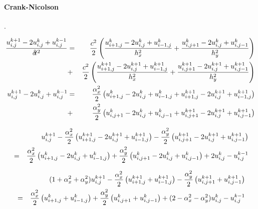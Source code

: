 \paragraph{Crank-Nicolson}.

\begin{eqnarray}
\frac{ u_{i,j}^{k+1} -2u_{i,j}^{k} +u_{i,j}^{k-1}  }{\delta\! t^2} 
&=& 
\frac{c^2}{2}
\left(
\frac{ u_{i+1,j}^{k} -2u_{i,j}^{k} +u_{i-1,j}^{k}  }{h_x^2} 
+
\frac{ u_{i,j+1}^{k} -2u_{i,j}^{k} +u_{i,j-1}^{k}  }{h_y^2} 
\right)
\nonumber\\
&+&
\frac{c^2}{2}
\left(
\frac{ u_{i+1,j}^{k+1} -2u_{i,j}^{k+1} +u_{i-1,j}^{k+1}  }{h_x^2} 
+
\frac{ u_{i,j+1}^{k+1} -2u_{i,j}^{k+1} +u_{i,j-1}^{k+1}  }{h_y^2} 
\right) 
\nonumber\\
u_{i,j}^{k+1} -2u_{i,j}^{k} +u_{i,j}^{k-1}  
&=&
\frac{\alpha_x^2}{2}
\left(
 u_{i+1,j}^{k} -2u_{i,j}^{k} +u_{i-1,j}^{k}  
+
 u_{i+1,j}^{k+1} -2u_{i,j}^{k+1} +u_{i-1,j}^{k+1}
\right) \nonumber\\
&+&
\frac{\alpha_y^2}{2}
\left(
u_{i,j+1}^{k} -2u_{i,j}^{k} +u_{i,j-1}^{k}  
+
u_{i,j+1}^{k+1} -2u_{i,j}^{k+1} +u_{i,j-1}^{k+1}
\right)
\nonumber
\end{eqnarray}

\begin{eqnarray}
&&u_{i,j}^{k+1} 
-\frac{\alpha_x^2}{2} \left( u_{i+1,j}^{k+1} -2u_{i,j}^{k+1} +u_{i-1,j}^{k+1} \right) 
-\frac{\alpha_y^2}{2} \left( u_{i,j+1}^{k+1} -2u_{i,j}^{k+1} +u_{i,j-1}^{k+1} \right) \nonumber\\
&=&
 \frac{\alpha_x^2}{2} \left( u_{i+1,j}^{k} -2u_{i,j}^{k} +u_{i-1,j}^{k}  \right)
+\frac{\alpha_y^2}{2} \left( u_{i,j+1}^{k} -2u_{i,j}^{k} +u_{i,j-1}^{k}  \right)
+2u_{i,j}^{k} -u_{i,j}^{k-1}  
\end{eqnarray}



\begin{mdframed}[backgroundcolor=blue!5]
\begin{eqnarray}
&&(1+\alpha_x^2+\alpha_y^2) u_{i,j}^{k+1} 
-\frac{\alpha_x^2}{2} \left( u_{i+1,j}^{k+1}  +u_{i-1,j}^{k+1} \right) 
-\frac{\alpha_y^2}{2} \left( u_{i,j+1}^{k+1}  +u_{i,j-1}^{k+1} \right) \nonumber\\
&=&
 \frac{\alpha_x^2}{2} \left( u_{i+1,j}^{k}  +u_{i-1,j}^{k}  \right)
+\frac{\alpha_y^2}{2} \left( u_{i,j+1}^{k}  +u_{i,j-1}^{k}  \right)
+(2-\alpha_x^2-\alpha_y^2)u_{i,j}^{k} -u_{i,j}^{k-1}  \label{eq:fdmwave2dCR}
\end{eqnarray}
\end{mdframed}

